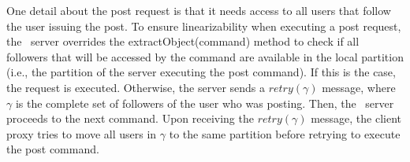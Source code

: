 One detail about the post request is that it needs access to all users that follow the user issuing the post.
To ensure linearizability when executing a post request, the \appname\ server overrides the extractObject(command) method to check if all followers that will be accessed by the command are available in the local partition (i.e., the partition of the server executing the post command).
If this is the case, the request is executed.
Otherwise, the server sends a $retry(\gamma)$ message, where $\gamma$ is the complete set of followers of the user who was posting.
Then, the \appname\ server proceeds to the next command.
Upon receiving the $retry(\gamma)$ message, the client proxy tries to move all users in $\gamma$ to the same partition before retrying to execute the post command.
